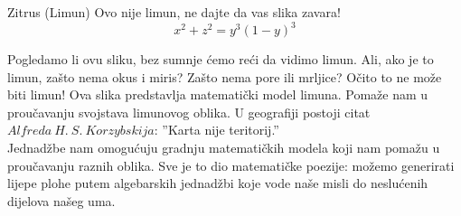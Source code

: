 \begin{surferPage}{Zitrus (Limun)}
Ovo nije limun, ne dajte da vas slika zavara!\\
\smallskip
\[x^2 + z^2 = y^3 (1 - y)^3\]


\singlespacing
Pogledamo li ovu sliku, bez sumnje \'{c}emo re\'{c}i da vidimo limun. Ali, ako je to limun, za\v{s}to nema okus i miris? Za\v{s}to nema pore ili mrljice? O\v{c}ito to ne mo\v{z}e biti limun!
\singlespacing
Ova slika predstavlja matemati\v{c}ki model limuna. Poma\v{z}e nam u prou\v{c}avanju svojstava limunovog oblika. U geografiji postoji citat $Alfreda\ H.\ S.\ Korzybskija$: ''Karta nije teritorij.''\\
\singlespacing
Jednad\v{z}be nam omogu\'{c}uju gradnju matemati\v{c}kih modela koji nam poma\v{z}u u prou\v{c}avanju raznih oblika.
\singlespacing
Sve je to dio matemati\v{c}ke poezije: mo\v{z}emo generirati lijepe plohe putem algebarskih jednad\v{z}bi koje vode na\v{s}e misli do neslu\'{c}enih dijelova na\v{s}eg uma.
\end{surferPage}
